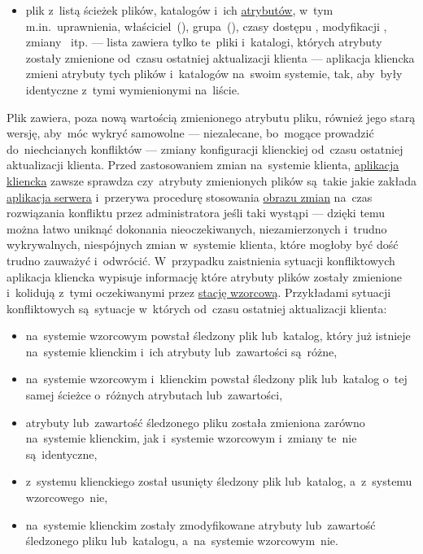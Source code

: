 \documentclass[thesis]{subfiles}
\begin{document}
\begin{itemize}
	\item plik  z~listą ścieżek plików, katalogów i~ich \href{https://serverfault.com/a/584102/289017}{atrybutów}, w~tym m.in.~uprawnienia, właściciel~(), grupa~(), czasy dostępu , modyfikacji , zmiany ~itp. --- lista zawiera tylko te~pliki i~katalogi, których atrybuty zostały zmienione od~czasu ostatniej aktualizacji klienta --- aplikacja kliencka zmieni atrybuty tych plików i~katalogów na~swoim systemie, tak, aby~były identyczne z~tymi wymienionymi na~liście.
\end{itemize}

Plik  zawiera, poza nową wartością zmienionego atrybutu pliku, również jego starą wersję, aby~móc wykryć samowolne --- niezalecane, bo~mogące prowadzić do~niechcianych konfliktów --- zmiany konfiguracji klienckiej od~czasu ostatniej aktualizacji klienta. Przed zastosowaniem zmian na~systemie klienta, \hyperref[sec:cli-app]{aplikacja kliencka} zawsze sprawdza czy~atrybuty zmienionych plików są~takie jakie zakłada \hyperref[sec:srv-app]{aplikacja serwera} i~przerywa procedurę stosowania \hyperref[sec:obraz-zmian-konfiguracji]{obrazu zmian} na~czas rozwiązania konfliktu przez administratora jeśli taki wystąpi --- dzięki temu można łatwo uniknąć dokonania nieoczekiwanych, niezamierzonych i~trudno wykrywalnych, niespójnych zmian w~systemie klienta, które mogłoby być dość trudno zauważyć i~odwrócić. W~przypadku zaistnienia sytuacji konfliktowych aplikacja kliencka wypisuje informację które atrybuty plików zostały zmienione i~kolidują z~tymi oczekiwanymi przez \hyperref[sec:srv-app]{stację wzorcową}. Przykładami sytuacji konfliktowych są~sytuacje w~których od~czasu ostatniej aktualizacji klienta:\mynobreakpar
\begin{itemize}
	\item na~systemie wzorcowym powstał śledzony plik lub~katalog, który już istnieje na~systemie klienckim i~ich atrybuty lub~zawartości są~różne,
	\item na~systemie wzorcowym i~klienckim powstał śledzony plik lub~katalog o~tej samej ścieżce o~różnych atrybutach lub~zawartości,
	\item atrybuty lub~zawartość śledzonego pliku została zmieniona zarówno na~systemie klienckim, jak i~systemie wzorcowym i~zmiany te~nie są~identyczne,
	\item z~systemu klienckiego został usunięty śledzony plik lub~katalog, a~z~systemu wzorcowego~nie,
	\item na~systemie klienckim zostały zmodyfikowane atrybuty lub~zawartość śledzonego pliku lub~katalogu, a~na~systemie wzorcowym~nie.
\end{itemize}
\end{document}

